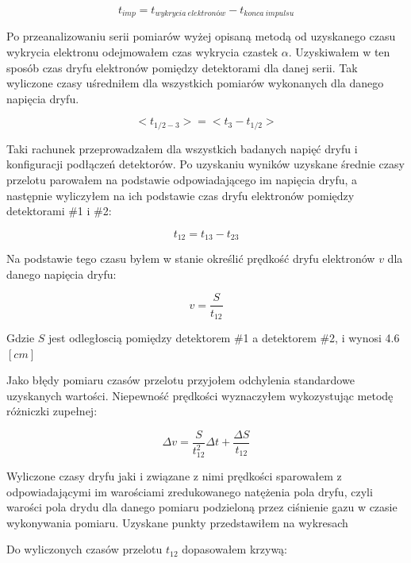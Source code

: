 \documentclass[10pt,a4paper]{article}
\begin{document}
\begin{equation*}
    t_{imp} = t_{wykrycia \: elektronów} - t_{konca \: impulsu}
\end{equation*}

Po przeanalizowaniu serii pomiarów wyżej opisaną metodą od uzyskanego czasu wykrycia elektronu odejmowałem czas wykrycia czastek $\alpha$. Uzyskiwałem w ten sposób czas dryfu elektronów pomiędzy detektorami dla danej serii. Tak wyliczone czasy uśredniłem dla wszystkich pomiarów wykonanych dla danego napięcia dryfu.

\begin{equation*}
    <t_{1/2-3}> = <t_{3} - t_{1/2}>
\end{equation*}

Taki rachunek przeprowadzałem dla wszystkich badanych napięć dryfu i konfiguracji podłączeń detektorów. Po uzyskaniu wyników uzyskane średnie czasy przelotu parowałem na podstawie odpowiadającego im napięcia dryfu, a następnie wyliczyłem na ich podstawie czas dryfu elektronów pomiędzy detektorami \#1 i \#2:

\begin{equation*}
    t_{12} = t_{13} - t_{23}
\end{equation*}

Na podstawie tego czasu byłem w stanie określić prędkość dryfu elektronów $v$ dla danego napięcia dryfu:

\begin{equation*}
    v = \frac{S}{t_{12}}
\end{equation*}

Gdzie $S$ jest odległoscią pomiędzy detektorem \#1 a detektorem \#2, i wynosi 4.6$[cm]$

Jako błędy pomiaru czasów przelotu przyjołem odchylenia standardowe uzyskanych wartości. Niepewność prędkości wyznaczyłem wykozystując metodę różniczki zupełnej:

\begin{equation*}
    \Delta v = \frac{S }{t^2_{12}} \Delta t + \frac{\Delta S}{t_{12}}
\end{equation*}

Wyliczone czasy dryfu jaki i związane z nimi prędkości sparowałem z odpowiadającymi im warościami zredukowanego natężenia pola dryfu, czyli warości pola drydu dla danego pomiaru podzieloną przez ciśnienie gazu w czasie wykonywania pomiaru. Uzyskane punkty przedstawiłem na wykresach

Do wyliczonych czasów przelotu $t_{12}$ dopasowałem krzywą:
\end{document}
